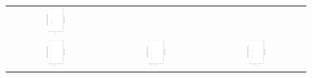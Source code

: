 \begin{figure}[h]
\begin{tabular}{ccc}
   \includegraphics[width=0.2\textwidth,angle=-90,origin=c]{Figures_Chapter7/Results_Chapter3/EPS_DI/3obj_WFG6.eps}
   \\
  \includegraphics[width=0.2\textwidth, angle=-90,origin=c]{Figures_Chapter7/Results_Chapter3/EPS_DI/3obj_WFG7.eps} &
   \includegraphics[width=0.2\textwidth, angle=-90,origin=c]{Figures_Chapter7/Results_Chapter3/EPS_DI/3obj_WFG8.eps} &
   \includegraphics[width=0.2\textwidth,angle=-90,origin=c]{Figures_Chapter7/Results_Chapter3/EPS_DI/3obj_WFG9.eps}
\end{tabular}
\end{figure}


